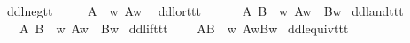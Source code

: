 \begin{isabellebody}
\begin{isamarkuptext}
\end{isamarkuptext}\isamarkuptrue%
%
\isanewline
{}\isamarkupfalse%
\ ddlneg{\isacharcolon}{\isacharcolon}{\isachardoublequoteopen}t{\isasymRightarrow}t{\isachardoublequoteclose}\ {\isacharparenleft}{\isachardoublequoteopen}\isactrlbold {\isasymnot}{\isachardoublequoteclose}{\isacharparenright}\ \isanewline
\ \ \ {\isachardoublequoteopen}\isactrlbold {\isasymnot}A\ {\isasymequiv}\ {\isasymlambda}w{\isachardot}\ {\isasymnot}A{\isacharparenleft}w{\isacharparenright}{\isachardoublequoteclose}\ \isanewline
{}\isamarkupfalse%
\ ddlor{\isacharcolon}{\isacharcolon}{\isachardoublequoteopen}t{\isasymRightarrow}t{\isasymRightarrow}t{\isachardoublequoteclose}\ {\isacharparenleft}{\isachardoublequoteopen}\isactrlbold {\isasymor}{\isachardoublequoteclose}{\isacharparenright}\ \isanewline
\ \ \ {\isachardoublequoteopen}\isactrlbold {\isasymor}\ A\ B\ {\isasymequiv}\ {\isasymlambda}w{\isachardot}\ {\isacharparenleft}A{\isacharparenleft}w{\isacharparenright}\ {\isasymor}\ B{\isacharparenleft}w{\isacharparenright}{\isacharparenright}{\isachardoublequoteclose}\isanewline
{}\isamarkupfalse%
\ ddland{\isacharcolon}{\isacharcolon}{\isachardoublequoteopen}t{\isasymRightarrow}t{\isasymRightarrow}t{\isachardoublequoteclose}\ {\isacharparenleft}{\isachardoublequoteopen}{\isacharunderscore}\isactrlbold {\isasymand}{\isacharunderscore}{\isachardoublequoteclose}{\isacharparenright}\isanewline
\ \ \ {\isachardoublequoteopen}A\isactrlbold {\isasymand}\ B\ {\isasymequiv}\ {\isasymlambda}w{\isachardot}\ {\isacharparenleft}A{\isacharparenleft}w{\isacharparenright}\ {\isasymand}\ B{\isacharparenleft}w{\isacharparenright}{\isacharparenright}{\isachardoublequoteclose}\isanewline
{}\isamarkupfalse%
\ ddlif{\isacharcolon}{\isacharcolon}{\isachardoublequoteopen}t{\isasymRightarrow}t{\isasymRightarrow}t{\isachardoublequoteclose}\ {\isacharparenleft}{\isachardoublequoteopen}{\isacharunderscore}\isactrlbold {\isasymrightarrow}{\isacharunderscore}{\isachardoublequoteclose}{\isacharparenright}\isanewline
\ \ \ {\isachardoublequoteopen}A\isactrlbold {\isasymrightarrow}B\ {\isasymequiv}\ {\isacharparenleft}{\isasymlambda}w{\isachardot}\ A{\isacharparenleft}w{\isacharparenright}{\isasymlongrightarrow}B{\isacharparenleft}w{\isacharparenright}{\isacharparenright}{\isachardoublequoteclose}\isanewline
{}\isamarkupfalse%
\ ddlequiv{\isacharcolon}{\isacharcolon}{\isachardoublequoteopen}t{\isasymRightarrow}t{\isasymRightarrow}t{\isachardoublequoteclose}\ {\isacharparenleft}{\isachardoublequoteopen}{\isacharunderscore}\isactrlbold {\isasymequiv}{\isacharunderscore}{\isachardoublequoteclose}{\isacharparenright}\isanewline

\end{isabellebody}

